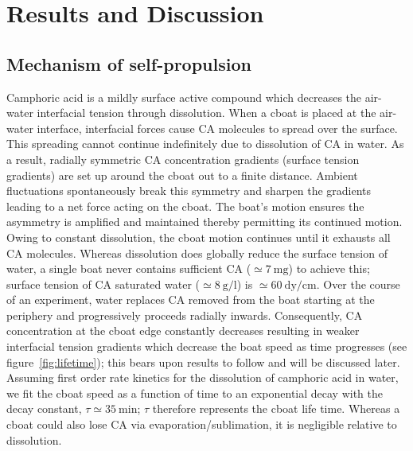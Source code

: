 \documentclass[journal=langd5, manuscript=article, layout=onecolumn]{achemso}
\begin{document}
\section{Results and Discussion}
\subsection{Mechanism of self-propulsion}
\label{sec:propmech}
Camphoric acid is a mildly surface active compound which decreases the air-water interfacial tension through dissolution. When a cboat is placed at the air-water interface, interfacial forces cause CA molecules to spread over the surface. This spreading cannot continue indefinitely due to dissolution of CA in water. As a result, radially symmetric CA concentration gradients (surface tension gradients) are set up around the cboat out to a finite distance. Ambient fluctuations spontaneously break this symmetry and sharpen the gradients leading to a net force acting on the cboat. The boat's motion ensures the asymmetry is amplified and maintained thereby permitting its continued motion. Owing to constant dissolution, the cboat motion continues until it exhausts all CA molecules. Whereas dissolution does globally reduce the surface tension of water, a single boat never contains sufficient CA ($\simeq 7\ \mathrm{mg}$) to achieve this; surface tension of CA saturated water ($\simeq 8\ \mathrm{g/l}$) is $\simeq 60\ \mathrm{dy/cm}$. Over the course of an experiment, water replaces CA removed from the boat starting at the periphery and progressively proceeds radially inwards. Consequently, CA concentration at the cboat edge constantly decreases resulting in weaker interfacial tension gradients which decrease the boat speed as time progresses (see figure~\ref{fig:lifetime}); this bears upon results to follow and will be discussed later. Assuming first order rate kinetics \cite{atkins2014} for the dissolution of camphoric acid in water, we fit the cboat speed as a function of time to an exponential decay with the decay constant, $\tau \simeq 35\ \mathrm{min}$; $\tau$ therefore represents the cboat life time. Whereas a cboat could also lose CA via evaporation/sublimation, it is negligible relative to dissolution.
\end{document}
